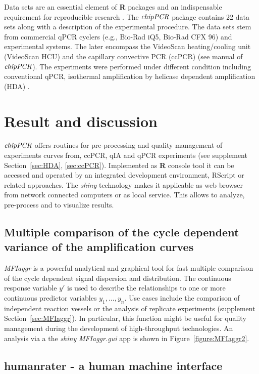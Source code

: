 \documentclass[twocolumn]{bmcart}%
\begin{document}
Data sets are an essential element of \textbf{R} packages \cite{hofmann_2013} 
and an indispensable requirement for reproducible research \cite{Leeper_2014}. 
The $\emph{chipPCR}$ package contains 22 data sets along with a description of 
the experimental procedure. The data sets stem from commercial qPCR cyclers 
(e.g., Bio-Rad iQ5, Bio-Rad CFX 96) and experimental systems. The later 
encompass the VideoScan heating/cooling unit (VideoScan HCU) 
\cite{roediger_highly_2013} and the capillary convective PCR (ccPCR) (see 
manual 
of $\emph{chipPCR}$). The experiments were performed under different condition 
including conventional qPCR, isothermal amplification by helicase dependent 
amplification (HDA) \cite{rodiger_nucleic_2014}.

\section*{Result and discussion}

$\emph{chipPCR}$ offers routines for pre-processing and quality management of 
experiments curves from, ccPCR, qIA and qPCR experiments (see supplement 
Section~\ref{sec:HDA}, \ref{sec:ccPCR}). Implemented as \textbf{R} console tool 
it can be accessed and operated by an integrated development environment, 
RScript or related approaches. The \emph{shiny} technology makes it applicable 
as web browser from network connected computers or as local service. This allows 
to analyze, pre-process and to visualize results.

\subsection*{Multiple comparison of the cycle dependent variance of the 
amplification curves}

\textsl{MFIaggr} is a powerful analytical and graphical tool for fast multiple 
comparison of the cycle dependent signal dispersion and distribution. The 
continuous response variable $y'$ is used to describe the relationships to one 
or more continuous predictor variables $y_1, ..., y_n$. Use cases include the 
comparison of independent reaction vessels or the analysis of replicate 
experiments (supplement Section~\ref{sec:MFIaggr}). In particular, this function 
might be useful for quality management during the development of high-throughput 
technologies. An analysis via a the \emph{shiny} \textsl{MFIaggr.gui} app is 
shown in Figure~\ref{figure:MFIaggr2}.

\subsection*{humanrater - a human machine interface}
\end{document}
